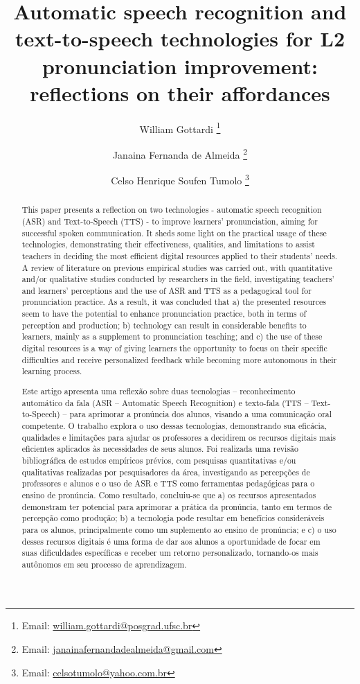 \documentclass[english]{textolivre}
\title{Automatic speech recognition and text-to-speech technologies for L2 pronunciation improvement: reflections on their affordances}
\author[1]{William Gottardi \orcid{0000-0002-1291-3953} \thanks{Email: \url{william.gottardi@posgrad.ufsc.br}}}
\author[1]{Janaina Fernanda de Almeida \orcid{0000-0003-3747-0279} \thanks{Email: \url{janainafernandadealmeida@gmail.com}}}
\author[1]{Celso Henrique Soufen Tumolo \orcid{0000-0001-5045-8712} \thanks{Email: \url{celsotumolo@yahoo.com.br}}}
\affil[1]{Universidade Federal de Santa Catarina, Centro de Comunicação e Expressão, Florianópolis, SC, Brasil.}
\begin{document}
\maketitle

\begin{polyabstract}
\begin{abstract}
This paper presents a reflection on two technologies - automatic speech recognition (ASR) and Text-to-Speech (TTS) - to improve learners’ pronunciation, aiming for successful spoken communication. It sheds some light on the practical usage of these technologies, demonstrating their effectiveness, qualities, and limitations to assist teachers in deciding the most efficient digital resources applied to their students’ needs. A review of literature on previous empirical studies was carried out, with quantitative and/or qualitative studies conducted by researchers in the field, investigating teachers’ and learners' perceptions and the use of ASR and TTS as a pedagogical tool for pronunciation practice. As a result, it was concluded that a) the presented resources seem to have the potential to enhance pronunciation practice, both in terms of perception and production; b) technology can result in considerable benefits to learners, mainly as a supplement to pronunciation teaching; and c) the use of these digital resources is a way of giving learners the opportunity to focus on their specific difficulties and receive personalized feedback while becoming more autonomous in their learning process.

\end{abstract}

\begin{portuguese}
\begin{abstract}
Este artigo apresenta uma reflexão sobre duas tecnologias – reconhecimento automático da fala (ASR – Automatic Speech Recognition) e texto-fala (TTS – Text-to-Speech) – para aprimorar a pronúncia dos alunos, visando a uma comunicação oral competente. O trabalho explora o uso dessas tecnologias, demonstrando sua eficácia, qualidades e limitações para ajudar os professores a decidirem os recursos digitais mais eficientes aplicados às necessidades de seus alunos. Foi realizada uma revisão bibliográfica de estudos empíricos prévios, com pesquisas quantitativas e/ou qualitativas realizadas por pesquisadores da área, investigando as percepções de professores e alunos e o uso de ASR e TTS como ferramentas pedagógicas para o ensino de pronúncia. Como resultado, concluiu-se que a) os recursos apresentados demonstram ter potencial para aprimorar a prática da pronúncia, tanto em termos de percepção como produção; b) a tecnologia pode resultar em benefícios consideráveis para os alunos, principalmente como um suplemento ao ensino de pronúncia; e c) o uso desses recursos digitais é uma forma de dar aos alunos a oportunidade de focar em suas dificuldades específicas e receber um retorno personalizado, tornando-os mais autônomos em seu processo de aprendizagem.


\end{abstract}
\end{portuguese}
\end{polyabstract}
\end{document}
